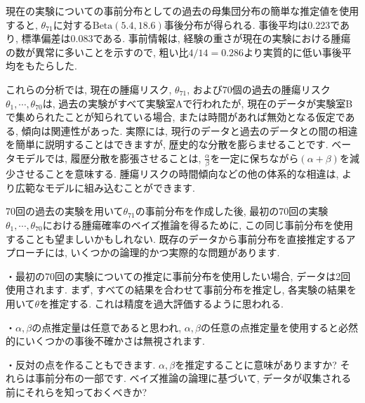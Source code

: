\documentclass[10pt,dvipdfmx,a4]{beamer}
\begin{document}

\begin{frame}
現在の実験についての事前分布としての過去の母集団分布の簡単な推定値を使用すると, $\theta_{71}$に対する$\text{Beta}(5.4,18.6)$事後分布が得られる.
事後平均は0.223であり, 標準偏差は0.083である.
事前情報は, 経験の重さが現在の実験における腫瘍の数が異常に多いことを示すので, 粗い比$4/14 = 0.286$より実質的に低い事後平均をもたらした.

これらの分析では, 現在の腫瘍リスク, $\theta_{71}$, および70個の過去の腫瘍リスク$\theta_1,\cdots, \theta_{70}$は, 過去の実験がすべて実験室Aで行われたが, 現在のデータが実験室Bで集められたことが知られている場合, または時間があれば無効となる仮定である, 傾向は関連性があった.
実際には, 現行のデータと過去のデータとの間の相違を簡単に説明することはできますが, 歴史的な分散を膨らませることです.
ベータモデルでは, 履歴分散を膨張させることは, $\tfrac{\alpha}{\beta}$を一定に保ちながら$(\alpha+\beta)$を減少させることを意味する.
腫瘍リスクの時間傾向などの他の体系的な相違は, より広範なモデルに組み込むことができます.
\end{frame}


\begin{frame}
70回の過去の実験を用いて$\theta_{71}$の事前分布を作成した後, 最初の70回の実験$\theta_1,\cdots,\theta_{70}$における腫瘍確率のベイズ推論を得るために, この同じ事前分布を使用することも望ましいかもしれない.
既存のデータから事前分布を直接推定するアプローチには, いくつかの論理的かつ実際的な問題があります.

・最初の70回の実験についての推定に事前分布を使用したい場合, データは2回使用されます.
まず, すべての結果を合わせて事前分布を推定し, 各実験の結果を用いて$\theta$を推定する.
これは精度を過大評価するように思われる.

・$\alpha,\beta$の点推定量は任意であると思われ, $\alpha,\beta$の任意の点推定量を使用すると必然的にいくつかの事後不確かさは無視されます.

・反対の点を作ることもできます.
$\alpha,\beta$を推定することに意味がありますか?
それらは事前分布の一部です.
ベイズ推論の論理に基づいて,  データが収集される前にそれらを知っておくべきか?
\end{frame}

\end{document}
